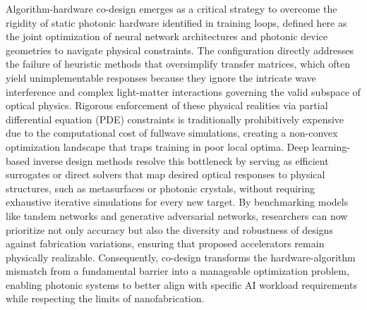 Algorithm-hardware co-design emerges as a critical strategy to overcome the rigidity of static photonic hardware identified in training loops, defined here as the joint optimization of neural network architectures and photonic device geometries to navigate physical constraints. \citep{doi_10_1109_dac63849_2025_11133307_892a6228} \citep{s2_c41720a8a362c412dc17bab4c3f329f2ac7c9818_1a5c96e4} The configuration directly addresses the failure of heuristic methods that oversimplify transfer matrices, which often yield unimplementable responses because they ignore the intricate wave interference and complex light-matter interactions governing the valid subspace of optical physics. Rigorous enforcement of these physical realities via partial differential equation (PDE) constraints is traditionally prohibitively expensive due to the computational cost of fullwave simulations, creating a non-convex optimization landscape that traps training in poor local optima. Deep learning-based inverse design methods resolve this bottleneck by serving as efficient surrogates or direct solvers that map desired optical responses to physical structures, such as metasurfaces or photonic crystals, without requiring exhaustive iterative simulations for every new target. By benchmarking models like tandem networks and generative adversarial networks, researchers can now prioritize not only accuracy but also the diversity and robustness of designs against fabrication variations, ensuring that proposed accelerators remain physically realizable. Consequently, co-design transforms the hardware-algorithm mismatch from a fundamental barrier into a manageable optimization problem, enabling photonic systems to better align with specific AI workload requirements while respecting the limits of nanofabrication. \citep{doi_10_48550_arxiv_2505_18377_a6fc9ec3} \citep{doi_10_1364_prj_415960_cf59d95b} \citep{doi_10_29026_oes_2022_210012_27973a69}

